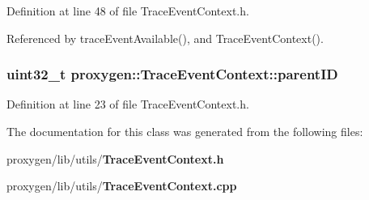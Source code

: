 Definition at line 48 of file Trace\+Event\+Context.\+h.



Referenced by trace\+Event\+Available(), and Trace\+Event\+Context().

\subsubsection[{parent\+ID}]{\setlength{\rightskip}{0pt plus 5cm}uint32\+\_\+t proxygen\+::\+Trace\+Event\+Context\+::parent\+ID}\label{classproxygen_1_1TraceEventContext_acf637620f9a47557e08bd93320e512de}


Definition at line 23 of file Trace\+Event\+Context.\+h.



The documentation for this class was generated from the following files\+:\begin{DoxyCompactItemize}
\item 
proxygen/lib/utils/{\bf Trace\+Event\+Context.\+h}\item 
proxygen/lib/utils/{\bf Trace\+Event\+Context.\+cpp}\end{DoxyCompactItemize}
